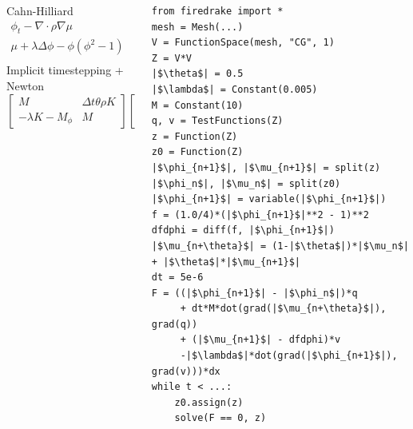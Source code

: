\documentclass[presentation,aspectratio=43]{beamer}
\begin{document}
\begin{frame}[fragile]
  \begin{columns}
    \begin{column}{0.5\textwidth}
      \begin{block}{Cahn-Hilliard}
        \small
        \begin{align*}
          \phi_t - \nabla \cdot \rho \nabla \mu &= 0\\
          \mu + \lambda \Delta \phi - \phi(\phi^2 - 1) &= 0\\
        \end{align*}
        Implicit timestepping + Newton
        \begin{equation*}
          \begin{bmatrix}
            M & \Delta t \theta \rho K \\
            -\lambda K - M_\phi & M
          \end{bmatrix}
          \begin{bmatrix}
            \delta\phi \\
            \delta\mu
          \end{bmatrix} =
          \begin{bmatrix}
            f_1 \\
            f_2
          \end{bmatrix}
        \end{equation*}
      \end{block}
    \end{column}
    \begin{column}{0.5\textwidth}
\begin{verbatim}
from firedrake import *
mesh = Mesh(...)
V = FunctionSpace(mesh, "CG", 1)
Z = V*V
|$\theta$| = 0.5
|$\lambda$| = Constant(0.005)
M = Constant(10)
q, v = TestFunctions(Z)
z = Function(Z)
z0 = Function(Z)
|$\phi_{n+1}$|, |$\mu_{n+1}$| = split(z)
|$\phi_n$|, |$\mu_n$| = split(z0)
|$\phi_{n+1}$| = variable(|$\phi_{n+1}$|)
f = (1.0/4)*(|$\phi_{n+1}$|**2 - 1)**2
dfdphi = diff(f, |$\phi_{n+1}$|)
|$\mu_{n+\theta}$| = (1-|$\theta$|)*|$\mu_n$| + |$\theta$|*|$\mu_{n+1}$|
dt = 5e-6
F = ((|$\phi_{n+1}$| - |$\phi_n$|)*q
     + dt*M*dot(grad(|$\mu_{n+\theta}$|), grad(q))
     + (|$\mu_{n+1}$| - dfdphi)*v
     -|$\lambda$|*dot(grad(|$\phi_{n+1}$|), grad(v)))*dx
while t < ...:
    z0.assign(z)
    solve(F == 0, z)
\end{verbatim}
    \end{column}
  \end{columns}
\end{frame}
\end{document}
